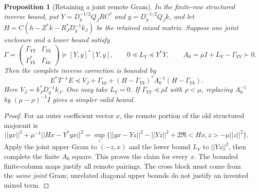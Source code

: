 \documentclass[11pt]{article}
\def\norm#1{||#1||}%
\def\ip#1#2{<#1,#2>}%
\newtheorem{proposition}[theorem]{Proposition}
\theoremstyle{remark}
\newcommand{\norm}[1]{\left\lVert #1\right\rVert}
\newcommand{\ip}[2]{\left\langle #1,#2\right\rangle}
\begin{document}
\begin{proposition}[Retaining a joint remote Gram]
\label{prop:v125-joint-remote}
In the finite-row structured inverse bound, put
$Y=D_g^{-1/2}Q_JRC^*$ and $y=D_g^{-1/2}Q_Jk$, and let
$H=C(h-Z^*k-R_J^*D_g^{-1}k_J)$ be the retained mixed matrix.
Suppose one joint enclosure and a lower bound satisfy
\[
 \Gamma=\begin{pmatrix}\Gamma_{YY}&\Gamma_{Yk}\\
 \Gamma_{Yk}^*&\Gamma_{kk}\end{pmatrix}
 \succeq [Y,y]^*[Y,y],\qquad 0\preceq L_Y\preceq Y^*Y,
 \qquad A_0=\mu I+L_Y-\Gamma_{YY}\succ0.
\]
Then the complete inverse correction is bounded by
\begin{equation}\label{eq:v125-joint-remote}
 E^*T^{-1}E\preceq V_J+\Gamma_{kk}
 +(H-\Gamma_{Yk})^*A_0^{-1}(H-\Gamma_{Yk}).
\end{equation}
Here $V_J=k_J^*D_g^{-1}k_J$.  One may take $L_Y=0$.
If $\Gamma_{YY}\preceq\rho I$ with $\rho<\mu$, replacing
$A_0^{-1}$ by $(\mu-\rho)^{-1}I$ gives a simpler valid bound.
\end{proposition}
\begin{proof}
For an outer coefficient vector $x$, the remote portion of the old
structured majorant is
\[
 \norm{yx}^2+\mu^{-1}\norm{Hx-Y^*yx}^2
 =\sup_z\{\norm{yx-Yz}^2-\norm{Yz}^2
       +2\Re\ip{Hx}{z}-\mu\norm z^2\}.
\]
Apply the joint upper Gram to $(-z,x)$ and the lower bound $L_Y$
to $\norm{Yz}^2$, then complete the finite $A_0$ square.
This proves the claim for every $x$.  The bounded finite-column maps
justify all remote pairings.  The cross block must come from the
\emph{same joint} Gram; unrelated diagonal upper bounds do not
justify an invented mixed term.
\end{proof}
\end{document}
